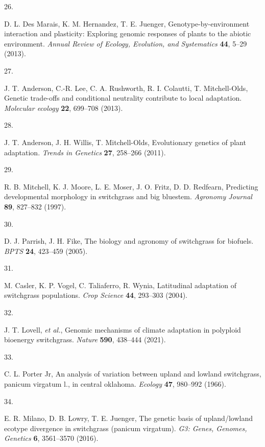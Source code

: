 \documentclass[
  9pt,
  twocolumn,
  twoside]{pnas-new}
\newlength{\cslhangindent}
\newlength{\csllabelwidth}
\newenvironment{CSLReferences}[2] %
 {\begin{list}{}{%
  \setlength{\itemindent}{0pt}
  \setlength{\leftmargin}{0pt}
  \setlength{\parsep}{0pt}
  \ifodd #1
   \setlength{\leftmargin}{\cslhangindent}
   \setlength{\itemindent}{-1\cslhangindent}
  \fi
  \setlength{\itemsep}{#2\baselineskip}}}
 {\end{list}}
\newcommand{\CSLLeftMargin}[1]{\parbox[t]{\csllabelwidth}{\strut#1\strut}}
\newcommand{\CSLRightInline}[1]{\parbox[t]{\linewidth - \csllabelwidth}{\strut#1\strut}}
\begin{document}
\begin{CSLReferences}{0}{1}
\CSLLeftMargin{26. }%
\CSLRightInline{D. L. Des Marais, K. M. Hernandez, T. E. Juenger,
Genotype-by-environment interaction and plasticity: Exploring genomic
responses of plants to the abiotic environment. \emph{Annual Review of
Ecology, Evolution, and Systematics} \textbf{44}, 5--29 (2013).}

\CSLLeftMargin{27. }%
\CSLRightInline{J. T. Anderson, C.-R. Lee, C. A. Rushworth, R. I.
Colautti, T. Mitchell-Olds, Genetic trade-offs and conditional
neutrality contribute to local adaptation. \emph{Molecular ecology}
\textbf{22}, 699--708 (2013).}

\CSLLeftMargin{28. }%
\CSLRightInline{J. T. Anderson, J. H. Willis, T. Mitchell-Olds,
Evolutionary genetics of plant adaptation. \emph{Trends in Genetics}
\textbf{27}, 258--266 (2011).}

\CSLLeftMargin{29. }%
\CSLRightInline{R. B. Mitchell, K. J. Moore, L. E. Moser, J. O. Fritz,
D. D. Redfearn, Predicting developmental morphology in switchgrass and
big bluestem. \emph{Agronomy Journal} \textbf{89}, 827--832 (1997).}

\CSLLeftMargin{30. }%
\CSLRightInline{D. J. Parrish, J. H. Fike, The biology and agronomy of
switchgrass for biofuels. \emph{BPTS} \textbf{24}, 423--459 (2005).}

\CSLLeftMargin{31. }%
\CSLRightInline{M. Casler, K. P. Vogel, C. Taliaferro, R. Wynia,
Latitudinal adaptation of switchgrass populations. \emph{Crop Science}
\textbf{44}, 293--303 (2004).}

\CSLLeftMargin{32. }%
\CSLRightInline{J. T. Lovell, \emph{et al.}, Genomic mechanisms of
climate adaptation in polyploid bioenergy switchgrass. \emph{Nature}
\textbf{590}, 438--444 (2021).}

\CSLLeftMargin{33. }%
\CSLRightInline{C. L. Porter Jr, An analysis of variation between upland
and lowland switchgrass, panicum virgatum l., in central oklahoma.
\emph{Ecology} \textbf{47}, 980--992 (1966).}

\CSLLeftMargin{34. }%
\CSLRightInline{E. R. Milano, D. B. Lowry, T. E. Juenger, The genetic
basis of upland/lowland ecotype divergence in switchgrass (panicum
virgatum). \emph{G3: Genes, Genomes, Genetics} \textbf{6}, 3561--3570
(2016).}


\end{CSLReferences}
\end{document}
